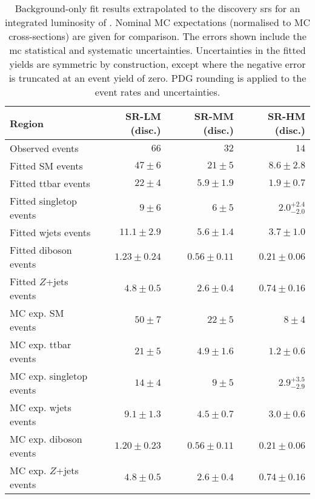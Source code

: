

\begin{table}
\begin{center}
{\small
\begin{tabular}{lrrr}
\toprule
Region           & SR-LM (disc.)           & SR-MM (disc.)           & SR-HM  (disc.)            \\
\midrule
Observed events          & $66$              & $32$              & $14$                    \\
\midrule
Fitted SM events         & $47 \pm 6$          & $21 \pm 5$          & $8.6 \pm 2.8$              \\
\midrule
        Fitted ttbar events         & $22 \pm 4$          & $5.9 \pm 1.9$          & $1.9 \pm 0.7$              \\
        Fitted singletop events         & $9 \pm 6$          & $6 \pm 5$          & $2.0_{-2.0}^{+2.4}$              \\
        Fitted wjets events         & $11.1 \pm 2.9$          & $5.6 \pm 1.4$          & $3.7 \pm 1.0$              \\
        Fitted diboson events         & $1.23 \pm 0.24$          & $0.56 \pm 0.11$          & $0.21 \pm 0.06$              \\
        Fitted $Z$+jets events         & $4.8 \pm 0.5$          & $2.6 \pm 0.4$          & $0.74 \pm 0.16$              \\
\toprule
MC exp. SM events              & $50 \pm 7$          & $22 \pm 5$          & $8 \pm 4$              \\
\midrule
        MC exp. ttbar events         & $21 \pm 5$          & $4.9 \pm 1.6$          & $1.2 \pm 0.6$              \\
        MC exp. singletop events         & $14 \pm 4$          & $9 \pm 5$          & $2.9_{-2.9}^{+3.5}$              \\
        MC exp. wjets events         & $9.1 \pm 1.3$          & $4.5 \pm 0.7$          & $3.0 \pm 0.6$              \\
        MC exp. diboson events         & $1.20 \pm 0.23$          & $0.56 \pm 0.11$          & $0.21 \pm 0.06$              \\
        MC exp. $Z$+jets events         & $4.8 \pm 0.5$          & $2.6 \pm 0.4$          & $0.74 \pm 0.16$              \\
\bottomrule
\end{tabular}
}
\end{center}
\caption{ Background-only fit results extrapolated to the discovery \glspl{sr} for an integrated luminosity of \onethirtynineifb. Nominal MC expectations (normalised to MC cross-sections) are given for comparison. The errors shown include the \gls{mc} statistical and systematic uncertainties. Uncertainties in the fitted yields are symmetric by construction, except where the negative error is truncated at an event yield of zero. PDG rounding is applied to the event rates and uncertainties.}
\label{tab:results_bkg_only_SR_disc}
\end{table}
%